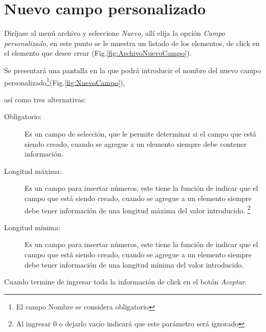 \section{Nuevo campo personalizado}
\label{sec:nuevoCampo}
Dir\'ijase al men\'u archivo y seleccione \emph{Nuevo}, all\'i elija la opci\'on \emph{Campo personalizado}, en este punto se le muestra un listado de los elementos, de click en el elemento que desee crear (Fig.\ref{fig:ArchivoNuevoCampo}). 
  

Se presentar\'a una pantalla en la que podr\'a introducir el nombre del nuevo
campo personalizado\footnote{El campo Nombre se considera obligatorio}(Fig.\ref{fig:NuevoCampo}),
  

as\'i como tres
alternativas:
\begin{description}
\item[Obligatorio:]Es un campo de selecci\'on, que le permite determinar si el
campo que est\'a siendo creado, cuando se agregue a un elemento siempre
debe contener informaci\'on.
\item[Longitud m\'axima:]Es un campo para insertar n\'umeros, este tiene la
funci\'on de indicar que el campo que est\'a siendo creado, cuando se agregue a un elemento siempre debe tener informaci\'on de una longitud
m\'axima del valor introducido.
\footnote{Al ingresar 0 o dejarlo vac\'io indicar\'a que este par\'ametro
ser\'a ignorado}
\item[Longitud m\'inima:]Es un campo para insertar n\'umeros, este tiene la
funci\'on de indicar que el campo que est\'a siendo creado, cuando se agregue a un elemento siempre debe tener informaci\'on de una longitud
m\'inima del valor introducido.
\footnotemark[\value{footnote}]
\end{description}

Cuando termine de ingresar toda la informaci\'on de click en el bot\'on \emph{Aceptar}.